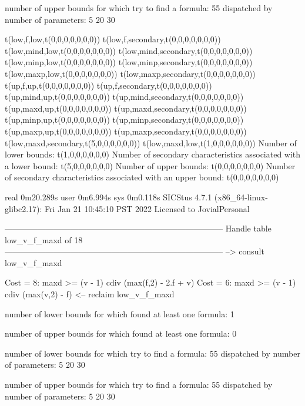 number of upper bounds for which try to find a formula: 55
dispatched by number of parameters: 5  20  30

t(low,f,low,t(0,0,0,0,0,0,0))
t(low,f,secondary,t(0,0,0,0,0,0,0))
t(low,mind,low,t(0,0,0,0,0,0,0))
t(low,mind,secondary,t(0,0,0,0,0,0,0))
t(low,minp,low,t(0,0,0,0,0,0,0))
t(low,minp,secondary,t(0,0,0,0,0,0,0))
t(low,maxp,low,t(0,0,0,0,0,0,0))
t(low,maxp,secondary,t(0,0,0,0,0,0,0))
t(up,f,up,t(0,0,0,0,0,0,0))
t(up,f,secondary,t(0,0,0,0,0,0,0))
t(up,mind,up,t(0,0,0,0,0,0,0))
t(up,mind,secondary,t(0,0,0,0,0,0,0))
t(up,maxd,up,t(0,0,0,0,0,0,0))
t(up,maxd,secondary,t(0,0,0,0,0,0,0))
t(up,minp,up,t(0,0,0,0,0,0,0))
t(up,minp,secondary,t(0,0,0,0,0,0,0))
t(up,maxp,up,t(0,0,0,0,0,0,0))
t(up,maxp,secondary,t(0,0,0,0,0,0,0))
t(low,maxd,secondary,t(5,0,0,0,0,0,0))
t(low,maxd,low,t(1,0,0,0,0,0,0))
Number of lower bounds:                                             t(1,0,0,0,0,0,0)
Number of secondary characteristics associated with a lower bound:  t(5,0,0,0,0,0,0)
Number of upper bounds:                                             t(0,0,0,0,0,0,0)
Number of secondary characteristics associated with an upper bound: t(0,0,0,0,0,0,0)

real	0m20.289s
user	0m6.994s
sys	0m0.118s
SICStus 4.7.1 (x86_64-linux-glibc2.17): Fri Jan 21 10:45:10 PST 2022
Licensed to JovialPersonal


--------------------------------------------------------------------------------
Handle table low_v_f_maxd of 18
--------------------------------------------------------------------------------
--> consult low_v_f_maxd

Cost =  8:  maxd >= (v - 1) cdiv (max(f,2) - 2.f + v)
Cost =  6:  maxd >= (v - 1) cdiv (max(v,2) - f)
<-- reclaim low_v_f_maxd

number of lower bounds for which found at least one formula: 1

number of upper bounds for which found at least one formula: 0

number of lower bounds for which try to find a formula: 55
dispatched by number of parameters: 5  20  30

number of upper bounds for which try to find a formula: 55
dispatched by number of parameters: 5  20  30

